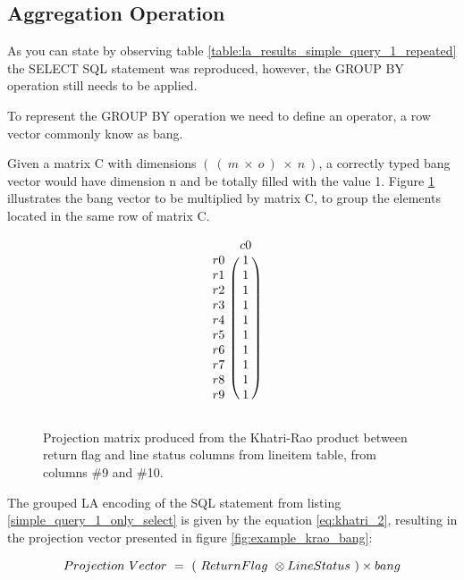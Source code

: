 \subsection{Aggregation Operation}

As you can state by observing table \ref{table:la_results_simple_query_1_repeated} the SELECT SQL statement was reproduced, however, the GROUP BY operation still needs to be applied. 

To represent the GROUP BY operation we need to define an operator, a row vector commonly know as bang\cite{macedo2015linear}. \par 

Given a matrix C with dimensions $(\ (\ m\ \times\ o\ )\ \times\ n\ )$, a correctly typed bang vector would have dimension n and be totally filled with the value 1. Figure \ref{fig:example_bang} illustrates the  bang vector to be multiplied by matrix C,  to group the elements located in the same row of matrix C.\par 

\begin{figure}[H]
\centering
\caption{Projection matrix produced from the Khatri-Rao product between return flag and line status columns from lineitem table, from columns \#9 and \#10.}
\[
\begin{blockarray}{cc}
		& c	0	\\
\begin{block}{c(c)}
r	0	&	1	\\
r	1	&	1	\\
r	2	&	1	\\
r	3	&	1	\\
r	4	&	1	\\
r	5	&	1	\\
r	6	&	1	\\
r	7	&	1	\\
r	8	&	1	\\
r	9	&	1	\\
\end{block}
\end{blockarray}
\]
\label{fig:example_bang}
\end{figure}

The grouped LA encoding of the SQL statement from listing \ref{simple_query_1_only_select} is given by the equation \ref{eq:khatri_2}, resulting in the projection vector presented in figure \ref{fig:example_krao_bang}:
 
\begin{equation}
\centering
Projection\ Vector\ =\ (\ ReturnFlag\ \otimes LineStatus\ ) \times bang
\label{eq:khatri_2}
\end{equation}





